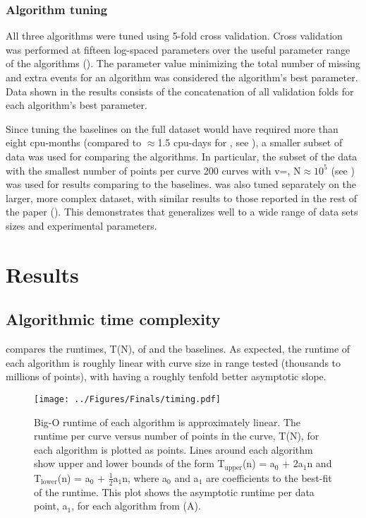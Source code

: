 \subsection{Algorithm tuning}

All three algorithms were tuned using 5-fold cross validation. Cross validation was performed at fifteen log-spaced parameters over the useful parameter range of the algorithms (). The parameter value minimizing the total number of missing and extra events for an algorithm was considered the algorithm's best parameter. Data shown in the results consists of the concatenation of all validation folds for each algorithm's best parameter. 

Since tuning the baselines on the full dataset would have required more than eight cpu-months (compared to $\approx$1.5 cpu-days for \name{}, see ), a smaller subset of data was used for comparing the algorithms. In particular, the subset of the data with the smallest number of points per curve \textemdash{} 200 curves with v=, N$\approx10^{5}$ (see ) \textemdash{} was used for results comparing \name{} to the baselines. \name{} was also tuned separately on the larger, more complex dataset, with similar results to those reported in the rest of the paper (). This demonstrates that \name{} generalizes well to a wide range of data sets sizes and experimental parameters.

\chapter{Results}

\section{Algorithmic time complexity}

 compares the runtimes, T(N), of \name{} and the baselines. As expected, the runtime of each algorithm is roughly linear with curve size in range tested (thousands to millions of points), with \name{} having a roughly tenfold better asymptotic slope.  

\begin{figure}[htpb]
\caption[Runtime versus length of curve]{\noindent{} Big-O runtime of each algorithm is approximately linear.  The runtime per curve versus number of points in the curve, T(N), for each algorithm is plotted as points. Lines around each algorithm show upper and lower bounds of the form T$_{\mathrm{upper}}$(n) = a$_0$ + 2a$_1$n  and T$_{\mathrm{lower}}$(n) = a$_0$ + $\frac{1}{2}$a$_1$n, where a$_0$ and a$_1$ are coefficients to the best-fit of the runtime.  This plot shows the asymptotic runtime per data point, a$_1$, for each algorithm from (A). }
\centering
\texttt{[image: ../Figures/Finals/timing.pdf]}%
\end{figure}


